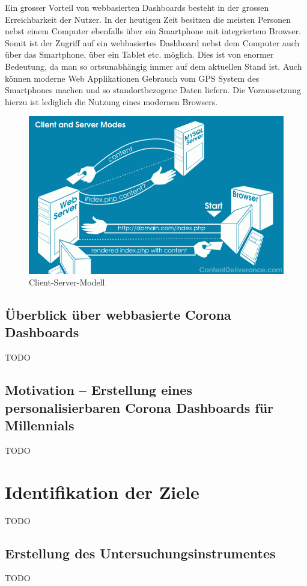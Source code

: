 \documentclass[12pt, oneside]{article}
\begin{document}
Ein grosser Vorteil von webbasierten Dashboards besteht in der grossen Erreichbarkeit der Nutzer. In der heutigen Zeit besitzen die meisten Personen nebst einem Computer ebenfalls über ein Smartphone mit integriertem Browser. Somit ist der Zugriff auf ein webbasiertes Dashboard nebst dem Computer auch über das Smartphone, über ein Tablet etc. möglich. Dies ist von enormer Bedeutung, da man so ortsunabhängig immer auf dem aktuellen Stand ist. Auch können moderne Web Applikationen Gebrauch vom GPS System des Smartphones machen und so standortbezogene Daten liefern. Die Voraussetzung hierzu ist lediglich die Nutzung eines modernen Browsers.

\begin{figure}[ht]
	\includegraphics[width=12cm]{images/client_server_model.png}
	\centering
	\caption{Client-Server-Modell ~\citep{client_server_model}}
\end{figure}


\subsection{Überblick über webbasierte Corona Dashboards}
TODO

\subsection{Motivation – Erstellung eines personalisierbaren Corona Dashboards für Millennials}
TODO

\clearpage
\section{Identifikation der Ziele}
TODO

\subsection{Erstellung des Untersuchungsinstrumentes}
TODO
\end{document}

